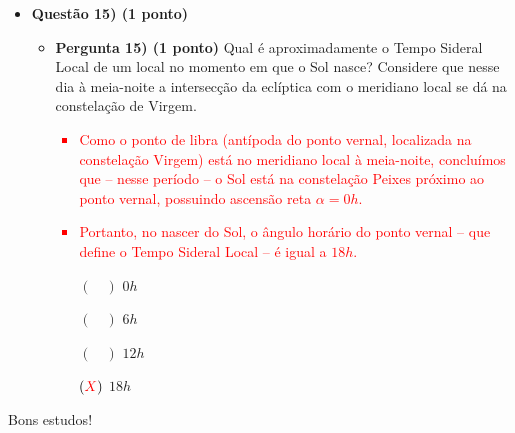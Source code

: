 \documentclass[a4paper, 12pt]{article}
\newcommand{\red}[1]{\textcolor{red}{#1}}
\begin{document}
\begin{flushleft}
\begin{itemize}
            \item \textbf{Questão 15) (1 ponto)}
                \begin{itemize}
                    \item \textbf{Pergunta 15) (1 ponto)} Qual é aproximadamente o Tempo Sideral Local de um local no momento em que o Sol nasce? Considere que nesse dia à meia-noite a intersecção da eclíptica com o meridiano local se dá na constelação de Virgem.
                        \red{\begin{itemize}
                            \item Como o ponto de libra (antípoda do ponto vernal, localizada na constelação Virgem) está no meridiano local à meia-noite, concluímos que -- nesse período -- o Sol está na constelação Peixes próximo ao ponto vernal, possuindo ascensão reta $\alpha=0h$.
                            \item Portanto, no nascer do Sol, o ângulo horário do ponto vernal -- que define o Tempo Sideral Local -- é igual a $18h$.
                        \end{itemize}}
                        \begin{itemize}
                            \item[$(\quad)$] $0h$
                            \item[$(\quad)$] $6h$
                            \item[$(\quad)$] $12h$
                            \item[$(\red{X})$] $18h$
                        \end{itemize}
                \end{itemize}
        \end{itemize} \end{flushleft}
    
    \begin{flushright}
        \begin{large}
            Bons estudos!
        \end{large}
    \end{flushright}
\end{document}
